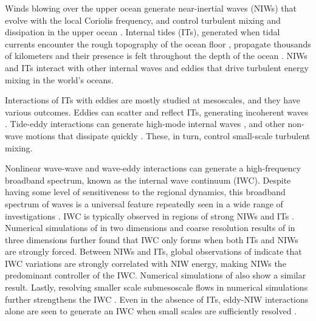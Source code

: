 \documentclass[../Rajarshi-thesis-draft.tex]{subfiles}
\begin{document}
Winds blowing over the upper ocean generate near-inertial waves (NIWs) that evolve with the local Coriolis frequency, and control turbulent mixing and dissipation in the upper ocean \citep{pinkel1985, Alford_MacKinnon_Simmons_Nash_2016,whalen2018}. Internal tides (ITs), generated when tidal currents encounter the rough topography of the ocean floor \citep{GK07, vic2018, gao2024, kerry2013, ray1996}, propagate thousands of kilometers and their presence is  felt throughout the depth of the ocean \citep{rudnick2003, ray1996,zaron2022}. NIWs and ITs interact with other internal waves and eddies that drive turbulent energy mixing in the world's oceans.

Interactions of ITs with eddies are mostly studied at mesoscales, and they have various outcomes. Eddies can scatter and reflect ITs, generating incoherent waves \citep{Dunphy_Lamb_2014, PonteKlein15}. Tide-eddy interactions can generate high-mode internal waves \citep{Huang_etal_2018, Lob_etal_2020,fan2024}, and other non-wave motions that dissipate quickly \citep{wang2023}. These, in turn, control small-scale turbulent mixing. %

Nonlinear wave-wave and wave-eddy interactions can generate a high-frequency broadband spectrum, known as the internal wave continuum (IWC). Despite having some level of sensitiveness to the  regional dynamics, this broadband spectrum of waves is a universal feature repeatedly seen in a wide range of investigations   \citep{Garrett_Munk_1972, Polzin_Lvov_2011, Pollmann_2020, le2021}.  IWC is typically observed in regions of strong NIWs and  ITs \citep{Muller_etal_2015,le2021}. Numerical simulations of \cite{sugiyama2009} in two dimensions and coarse resolution results of \cite{Muller_etal_2015} in three dimensions further found that IWC only forms when both ITs and NIWs are strongly forced. Between NIWs and ITs, global observations of \cite{le2021}  indicate that IWC variations are strongly correlated with NIW energy, making NIWs the predominant controller of the IWC. Numerical simulations of \cite{delpech_etal_2024} also show a similar result. Lastly, resolving smaller scale submesoscale flows in numerical simulations further strengthens the IWC \citep{nelson2020}. Even in the absence of ITs, eddy-NIW interactions alone are seen to generate an IWC when small scales are sufficiently resolved \citep{Yang_etal_2023}. %
\end{document}
